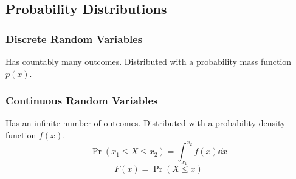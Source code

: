 \documentclass{article}
\begin{document}
\begin{minipage}{126.1962963mm}
    \begin{multicols}{2}
        \subsection*{Probability Distributions}
        \subsubsection*{Discrete Random Variables}
        Has countably many outcomes. Distributed with a
        probability mass function $p(x)$.
        \subsubsection*{Continuous Random Variables}
        Has an infinite number of outcomes. Distributed with a
        probability density function $f(x)$.
        \begin{equation*}
            \Pr{\left( x_1 \leq X \leq x_2 \right)} = \int_{x_1}^{x_2} f(x) \dd{x}
        \end{equation*}
        \begin{equation*}
            F(x) = \Pr{\left( X \leq x \right)}
        \end{equation*}

\end{multicols}
\end{minipage}
\end{document}
